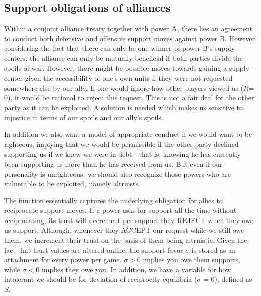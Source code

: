 \documentclass[a4paper]{article} %
\begin{document}
\subsection{Support obligations of alliances}

Within a conjoint alliance treaty together with power A, there lies an agreement to conduct both defensive and offensive support moves against power B. However, considering the fact that there can only be one winner of power B’s supply centers, the alliance can only be mutually beneficial if both parties divide the spoils of war. However, there might be possible moves towards gaining a supply center given the accessibility of one's own units if they were not requested somewhere else by our ally. If one would ignore how other players viewed us ($R$= 0), it would be rational to reject this request. This is not a fair deal for the other party as it can be exploited. A solution is needed which makes us sensitive to injustice in terms of our spoils and our ally's spoils.

 In addition we also want a model of appropriate conduct if we would want to be righteous, implying that we would be permissible if the other party declined supporting us if we knew we were in debt - that is, knowing he has currently been supporting us more than he has received from us. But even if our personality is unrighteous, we should also recognize those powers who are vulnerable to be exploited, namely altruists.

The function essentially captures the underlying obligation for allies to reciprocate support-moves. If a power asks for support all the time without reciprocating, its trust will decrement per support they REJECT when they owe us support. Although, whenever they  ACCEPT our request while we still owe them, we increment their trust on the basis of them being altruistic. Given the fact that trust-values are altered online, the support-favor $\sigma$ is stored as an attachment for every power per game. $\sigma > 0 $ implies you owe them supports, while $\sigma < 0$ implies they owe you. In addition, we have a variable for how intolerant we should be for deviation of reciprocity equilibria ($\sigma$ = 0), defined as $S$.\\
\end{document}
